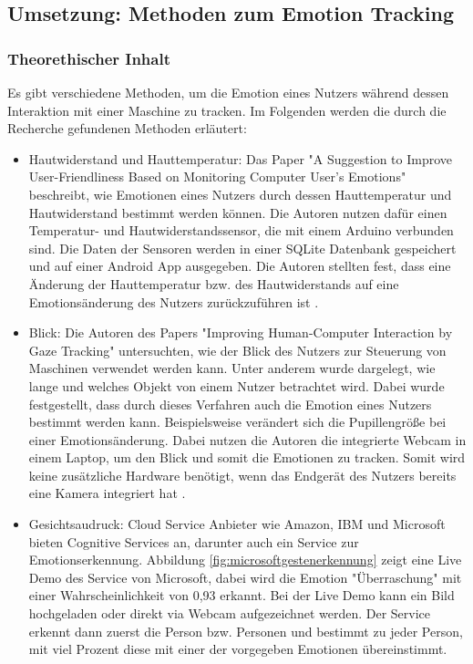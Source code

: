 \subsection{Umsetzung: Methoden zum Emotion Tracking} \label{MethodenEmotionTracking}
\subsubsection*{Theorethischer Inhalt}
Es gibt verschiedene Methoden, um die Emotion eines Nutzers während dessen Interaktion mit einer Maschine zu tracken. Im Folgenden werden die durch die Recherche gefundenen  Methoden erläutert:

\begin{itemize}
\item Hautwiderstand und Hauttemperatur:
Das Paper "A Suggestion to Improve User-Friendliness Based
on Monitoring Computer User’s Emotions" beschreibt, wie Emotionen eines Nutzers durch dessen Hauttemperatur und Hautwiderstand bestimmt werden können. Die Autoren nutzen dafür einen Temperatur- und Hautwiderstandssensor, die mit einem Arduino verbunden sind. Die Daten der Sensoren werden in einer SQLite Datenbank gespeichert und auf einer Android App ausgegeben. Die Autoren stellten fest, dass eine Änderung der Hauttemperatur bzw. des Hautwiderstands  auf eine Emotionsänderung des Nutzers zurückzuführen ist \cite{EmotionTrackingGSR}.

\item Blick: Die Autoren des Papers "Improving Human-Computer Interaction
by Gaze Tracking" untersuchten, wie der Blick des Nutzers zur Steuerung von Maschinen verwendet werden kann. Unter anderem wurde dargelegt, wie lange und welches Objekt von einem Nutzer betrachtet wird. Dabei wurde festgestellt, dass durch dieses Verfahren auch die Emotion eines Nutzers bestimmt werden kann. Beispielsweise verändert sich die Pupillengröße bei einer Emotionsänderung. Dabei nutzen die Autoren die integrierte Webcam in einem Laptop, um den Blick und somit die Emotionen zu tracken. Somit wird keine zusätzliche Hardware benötigt, wenn das Endgerät des Nutzers bereits eine Kamera integriert hat \cite{EmotionTrackingGaze}.

\item Gesichtsaudruck: Cloud Service Anbieter wie Amazon, IBM und Microsoft bieten Cognitive Services an, darunter auch ein Service zur Emotionserkennung. Abbildung \ref{fig:microsoftgestenerkennung} zeigt eine Live Demo des Service von Microsoft, dabei wird die Emotion "Überraschung" mit einer Wahrscheinlichkeit von 0,93 erkannt. Bei der Live Demo kann ein Bild hochgeladen oder direkt via Webcam aufgezeichnet werden. Der Service erkennt dann zuerst die Person bzw. Personen und bestimmt zu jeder Person, mit viel Prozent diese mit einer der vorgegeben Emotionen übereinstimmt.


\end{itemize}
